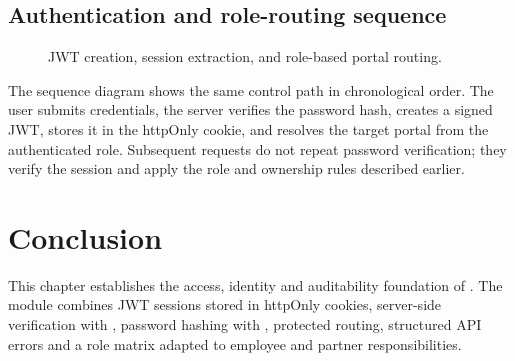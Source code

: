 \subsection{Authentication and role-routing sequence}
\begin{figure}[htbp]
  \centering
  \caption{JWT creation, session extraction, and role-based portal routing.}
\end{figure}
The sequence diagram shows the same control path in chronological order. The user submits credentials, the server verifies the password hash, creates a signed JWT, stores it in the httpOnly cookie, and resolves the target portal from the authenticated role. Subsequent requests do not repeat password verification; they verify the session and apply the role and ownership rules described earlier.
\section*{Conclusion}
This chapter establishes the access, identity and auditability foundation of \projectname{}. The module combines JWT sessions stored in httpOnly cookies, server-side verification with , password hashing with , protected routing, structured API errors and a role matrix adapted to employee and partner responsibilities.
